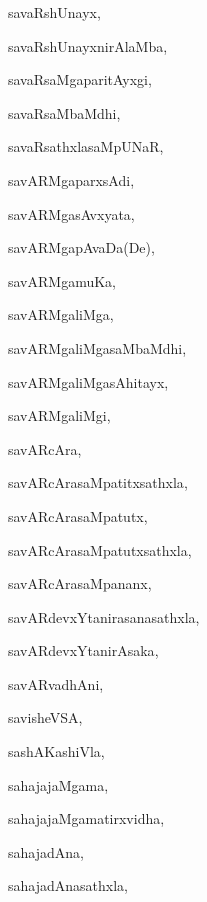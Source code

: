 \begin{multicols}{3}
{\noindent
{savaRshUnayx}, \pageref{savaRshUnayx}

\noindent
{savaRshUnayxnirAlaMba}, \pageref{savaRshUnayxnirAlaMba}

\noindent
{savaRsaMgaparitAyxgi}, \pageref{savaRsaMgaparitAyxgi}

\noindent
{savaRsaMbaMdhi}, \pageref{savaRsaMbaMdhi}

\noindent
{savaRsathxlasaMpUNaR}, \pageref{savaRsathxlasaMpUNaR}

\noindent
{savARMgaparxsAdi}, \pageref{savARMgaparxsAdi}

\noindent
{savARMgasAvxyata}, \pageref{savARMgasAvxyata}

\noindent
{savARMgapAvaDa(De)}, \pageref{savARMgapAvaDaDe}

\noindent
{savARMgamuKa}, \pageref{savARMgamuKa}

\noindent
{savARMgaliMga}, \pageref{savARMgaliMga}

\noindent
{savARMgaliMgasaMbaMdhi}, \pageref{savARMgaliMgasaMbaMdhi}

\noindent
{savARMgaliMgasAhitayx}, \pageref{savARMgaliMgasAhitayx}

\noindent
{savARMgaliMgi}, \pageref{savARMgaliMgi}

\noindent
{savARcAra}, \pageref{savARcAra}

\noindent
{savARcArasaMpatitxsathxla}, \pageref{savARcArasaMpatitxsathxla}

\noindent
{savARcArasaMpatutx}, \pageref{savARcArasaMpatutx}

\noindent
{savARcArasaMpatutxsathxla}, \pageref{savARcArasaMpatutxsathxla}

\noindent
{savARcArasaMpananx}, \pageref{savARcArasaMpananx}

\noindent
{savARdevxYtanirasanasathxla}, \pageref{savARdevxYtanirasanasathxla}

\noindent
{savARdevxYtanirAsaka}, \pageref{savARdevxYtanirAsaka}

\noindent
{savARvadhAni}, \pageref{savARvadhAni}

\noindent
{savisheVSA}, \pageref{savisheVSA}

\noindent
{sashAKashiVla}, \pageref{sashAKashiVla}

\noindent
{sahajajaMgama}, \pageref{sahajajaMgama}

\noindent
{sahajajaMgamatirxvidha}, \pageref{sahajajaMgamatirxvidha}

\noindent
{sahajadAna}, \pageref{sahajadAna}

\noindent
{sahajadAnasathxla}, \pageref{sahajadAnasathxla}

}
\end{multicols}
